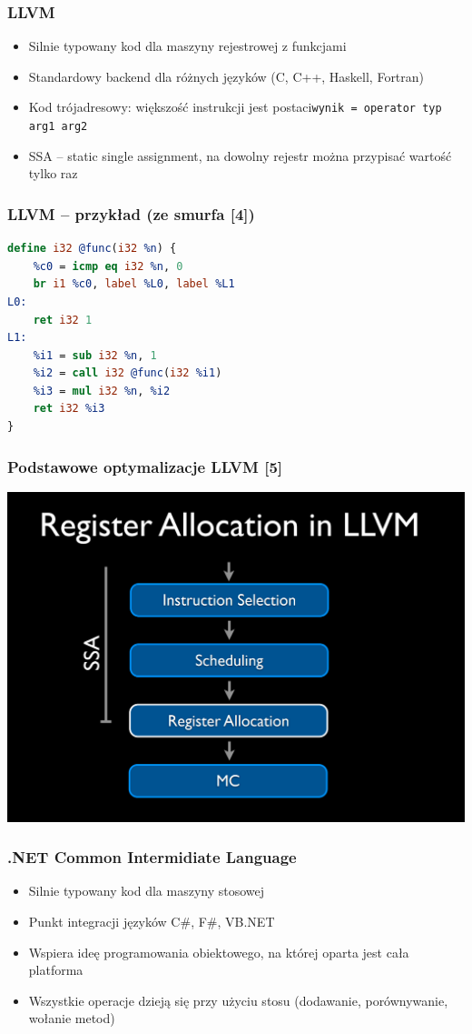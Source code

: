\documentclass{beamer}
\begin{document}
	\begin{frame}
		\frametitle{LLVM}
		\begin{itemize}
			\item Silnie typowany kod dla maszyny rejestrowej z funkcjami
			\item Standardowy backend dla różnych języków (C, C++, Haskell, Fortran)
			\item Kod trójadresowy: większość instrukcji jest postaci\newline\texttt{wynik = operator typ arg1 arg2}
			\item SSA -- static single assignment, na dowolny rejestr można przypisać wartość tylko raz
		\end{itemize}
	\end{frame}

	\begin{frame}[fragile]
		\frametitle{LLVM -- przykład (ze smurfa [4])}
		\begin{lstlisting}[language=llvm]
define i32 @func(i32 %n) {
	%c0 = icmp eq i32 %n, 0
	br i1 %c0, label %L0, label %L1
L0:
	ret i32 1
L1:
	%i1 = sub i32 %n, 1
	%i2 = call i32 @func(i32 %i1)
	%i3 = mul i32 %n, %i2
	ret i32 %i3 
}
		\end{lstlisting}
	\end{frame}
	
	\begin{frame}
		\frametitle{Podstawowe optymalizacje LLVM [5]}
		\includegraphics[width=\textwidth]{llvm.png}
	\end{frame}

	\begin{frame}
		\frametitle{.NET Common Intermidiate Language}
		\begin{itemize}
			\item Silnie typowany kod dla maszyny stosowej
			\item Punkt integracji języków C\#, F\#, VB.NET
			\item Wspiera ideę programowania obiektowego, na której oparta jest cała platforma
			\item Wszystkie operacje dzieją się przy użyciu stosu (dodawanie, porównywanie, wołanie metod)
		\end{itemize}
	\end{frame}
\end{document}
